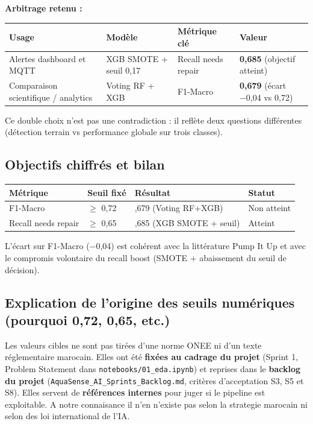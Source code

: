 \documentclass[11pt,a4paper]{report}
\begin{document}
\textbf{Arbitrage retenu :}

{\small
\begin{longtable}{@{}>{\raggedright\arraybackslash}p{}>{\raggedright\arraybackslash}p{}>{\raggedright\arraybackslash}p{}>{\raggedright\arraybackslash}p{}@{}}
\toprule
\rowcolor{EHTPTableHead}Usage & Modèle & Métrique clé & Valeur \\
\midrule
Alertes dashboard et MQTT & XGB SMOTE + seuil 0,17 & Recall needs repair & \textbf{0,685} (objectif atteint) \\
Comparaison scientifique / analytics & Voting RF + XGB & F1-Macro & \textbf{0,679} (écart −0,04 vs 0,72) \\
\bottomrule
\end{longtable}
}

Ce double choix n'est pas une contradiction : il reflète deux questions différentes (détection terrain vs performance globale sur trois classes).

\subsection{Objectifs chiffrés et bilan}

{\small
\begin{longtable}{@{}>{\raggedright\arraybackslash}p{}>{\raggedright\arraybackslash}p{}>{\raggedright\arraybackslash}p{}>{\raggedright\arraybackslash}p{}@{}}
\toprule
\rowcolor{EHTPTableHead}Métrique & Seuil fixé & Résultat & Statut \\
\midrule
F1-Macro & $\geq$ 0,72 & 0,679 (Voting RF+XGB) & Non atteint \\
Recall needs repair & $\geq$ 0,65 & 0,685 (XGB SMOTE + seuil) & Atteint \\
\bottomrule
\end{longtable}
}

L'écart sur F1-Macro (−0,04) est cohérent avec la littérature Pump It Up et avec le compromis volontaire du recall boost (SMOTE + abaissement du seuil de décision).

\subsection{Explication de l'origine des seuils numériques (pourquoi 0,72, 0,65, etc.)}

Les valeurs cibles ne sont pas tirées d'une norme ONEE ni d'un texte réglementaire marocain. Elles ont été \textbf{fixées au cadrage du projet} (Sprint 1, Problem Statement dans \texttt{notebooks/01\_eda.ipynb}) et reprises dans le \textbf{backlog du projet} (\texttt{AquaSense\_AI\_Sprints\_Backlog.md}, critères d'acceptation S3, S5 et S8). Elles servent de \textbf{références internes} pour juger si le pipeline est exploitable. A notre connaisance il n'en n'existe pas selon la strategie marocain ni selon des loi international de l'IA.
\end{document}
